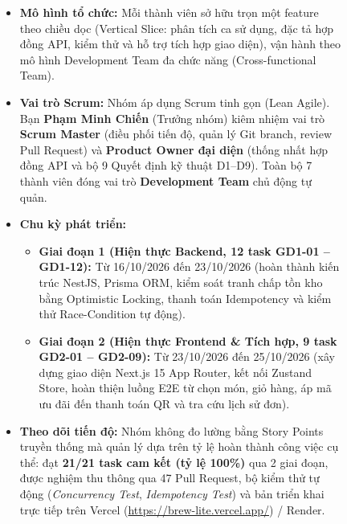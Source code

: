 \begin{figure}[H]
\centering
\begin{tcolorbox}[colback=gray!5,colframe=gray!50,title=Ghi nhận tiến độ và số liệu thực tế của Nhóm]
\begin{itemize}[leftmargin=1.5cm]
  \item \textbf{Mô hình tổ chức:} Mỗi thành viên sở hữu trọn một feature theo chiều dọc (Vertical Slice: phân tích ca sử dụng, đặc tả hợp đồng API, kiểm thử và hỗ trợ tích hợp giao diện), vận hành theo mô hình Development Team đa chức năng (Cross-functional Team).
  
  \item \textbf{Vai trò Scrum:} Nhóm áp dụng Scrum tinh gọn (Lean Agile). Bạn \textbf{Phạm Minh Chiến} (Trưởng nhóm) kiêm nhiệm vai trò \textbf{Scrum Master} (điều phối tiến độ, quản lý Git branch, review Pull Request) và \textbf{Product Owner đại diện} (thống nhất hợp đồng API và bộ 9 Quyết định kỹ thuật D1--D9). Toàn bộ 7 thành viên đóng vai trò \textbf{Development Team} chủ động tự quản.
  
  \item \textbf{Chu kỳ phát triển:}
  \begin{itemize}
    \item \textbf{Giai đoạn 1 (Hiện thực Backend, 12 task GD1-01 -- GD1-12):} Từ 16/10/2026 đến 23/10/2026 (hoàn thành kiến trúc NestJS, Prisma ORM, kiểm soát tranh chấp tồn kho bằng Optimistic Locking, thanh toán Idempotency và kiểm thử Race-Condition tự động).
    \item \textbf{Giai đoạn 2 (Hiện thực Frontend \& Tích hợp, 9 task GD2-01 -- GD2-09):} Từ 23/10/2026 đến 25/10/2026 (xây dựng giao diện Next.js 15 App Router, kết nối Zustand Store, hoàn thiện luồng E2E từ chọn món, giỏ hàng, áp mã ưu đãi đến thanh toán QR và tra cứu lịch sử đơn).
  \end{itemize}
  
  \item \textbf{Theo dõi tiến độ:} Nhóm không đo lường bằng Story Points truyền thống mà quản lý dựa trên tỷ lệ hoàn thành công việc cụ thể: đạt \textbf{21/21 task cam kết (tỷ lệ 100\%)} qua 2 giai đoạn, được nghiệm thu thông qua 47 Pull Request, bộ kiểm thử tự động (\textit{Concurrency Test}, \textit{Idempotency Test}) và bản triển khai trực tiếp trên Vercel (\url{https://brew-lite.vercel.app/}) / Render.
  

\end{itemize}
\end{tcolorbox}
\end{figure}
